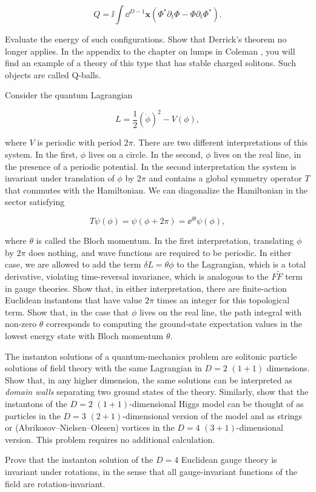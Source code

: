 \begin{banksproblems}
\[
  Q=\ii\int\dd^{D-1}\mathbf x
  \left(\Phi^*\partial_t\Phi-\Phi\partial_t\Phi^*\right).
\]

Evaluate the energy of such configurations. Show that Derrick's theorem no
longer applies. In the appendix to the chapter on lumps in Coleman \cite{banks-ref-138},
you will find an example of a theory of this type that has stable charged
solitons. Such objects are called Q-balls.

Consider the quantum Lagrangian

\[
  L=\frac12(\dot\phi)^2-V(\phi),
\]

where $V$ is periodic with period $2\pi$. There are two different
interpretations of this system. In the first, $\phi$ lives on a circle. In the
second, $\phi$ lives on the real line, in the presence of a periodic potential.
In the second interpretation the system is invariant under translation of $\phi$
by $2\pi$ and contains a global symmetry operator $T$ that commutes with the
Hamiltonian. We can diagonalize the Hamiltonian in the sector satisfying

\[
  T\psi(\phi)=\psi(\phi+2\pi)=\ee^{\ii\theta}\psi(\phi),
\]

where $\theta$ is called the Bloch momentum. In the first interpretation,
translating $\phi$ by $2\pi$ does nothing, and wave functions are required to be
periodic. In either case, we are allowed to add the term
$\delta L=\theta\dot\phi$ to the Lagrangian, which is a total derivative,
violating time-reversal invariance, which is analogous to the $F\widetilde F$
term in gauge theories. Show that, in either interpretation, there are
finite-action Euclidean instantons that have value $2\pi$ times an integer for
this topological term. Show that, in the case that $\phi$ lives on the real
line, the path integral with non-zero $\theta$ corresponds to computing the
ground-state expectation values in the lowest energy state with Bloch momentum
$\theta$.

The instanton solutions of a quantum-mechanics problem are solitonic particle
solutions of field theory with the same Lagrangian in $D=2$ $(1+1)$ dimensions.
Show that, in any higher dimension, the same solutions can be interpreted as
\emph{domain walls} separating two ground states of the theory. Similarly, show
that the instantons of the $D=2$ $(1+1)$-dimensional Higgs model can be thought
of as particles in the $D=3$ $(2+1)$-dimensional version of the model and as
strings or (Abrikosov--Nielsen--Olesen) vortices in the $D=4$ $(3+1)$-dimensional
version. This
problem requires no additional calculation.

Prove that the instanton solution of the $D=4$ Euclidean gauge theory is invariant
under rotations, in the sense that all gauge-invariant functions of the field are
rotation-invariant.

\end{banksproblems}
